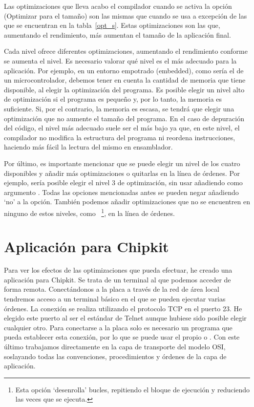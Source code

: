 Las optimizaciones que lleva acabo el compilador cuando se activa la opción  (Optimizar para el tamaño) son las mismas que cuando se usa  a excepción de las que se encuentran en la tabla~\ref{opt_s}. Estas optimizaciones son las que, aumentando el rendimiento, más aumentan el tamaño de la aplicación final.

Cada nivel ofrece diferentes optimizaciones, aumentando el rendimiento conforme se aumenta el nivel. Es necesario valorar qué nivel es el más adecuado para la aplicación. Por ejemplo, en un entorno empotrado (embedded), como sería el de un microcontrolador, debemos tener en cuenta la cantidad de memoria que tiene disponible, al elegir la optimización del programa. Es posible elegir un nivel alto de optimización si el programa es pequeño y, por lo tanto, la memoria es suficiente. Si, por el contrario, la memoria es escasa, se tendrá que elegir una optimización que no aumente el tamaño del programa. En el caso de depuración del código, el nivel más adecuado suele ser el más bajo ya que, en este nivel, el compilador no modifica la estructura del programa ni reordena instrucciones, haciendo más fácil la lectura del mismo en ensamblador.

Por último, es importante mencionar que se puede elegir un nivel de los cuatro disponibles y añadir más optimizaciones o quitarlas en la línea de órdenes. Por ejemplo, sería posible elegir el nivel 3 de optimización, sin usar  añadiendo como argumento . Todas las opciones mencionadas antes se pueden negar añadiendo `no' a la opción. También podemos añadir optimizaciones que no se encuentren en ninguno de estos niveles, como ~\footnote{Esta opción `desenrolla' bucles, repitiendo el bloque de ejecución y reduciendo las veces que se ejecuta.}, en la línea de órdenes.

\section{Aplicación para Chipkit}

Para ver los efectos de las optimizaciones que  pueda efectuar, he creado una aplicación para Chipkit. Se trata de un terminal al que podemos acceder de forma remota. Conectándonos a la placa a través de la red de área local tendremos acceso a un terminal básico en el que se pueden ejecutar varias órdenes. La conexión se realiza utilizando el protocolo TCP en el puerto 23. He elegido este puerto al ser el estándar de Telnet aunque hubiese sido posible elegir cualquier otro. Para conectarse a la placa solo es necesario un programa que pueda establecer esta conexión, por lo que se puede usar el propio  o . Con este último trabajamos directamente en la capa de transporte del modelo OSI, soslayando todas las convenciones, procedimientos y órdenes de la capa de aplicación.


